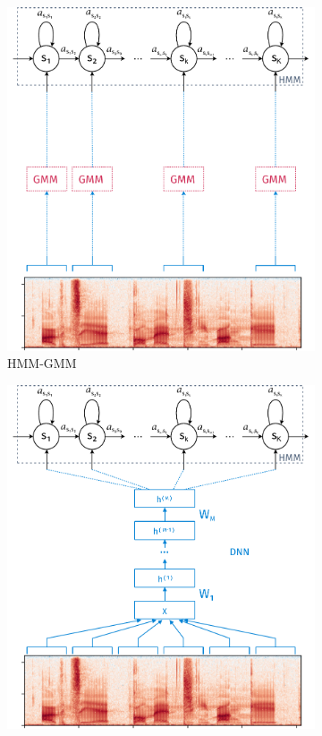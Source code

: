 \begin{figure}[htpb]
  \centering
  \begin{subfigure}[b]{0.4\textwidth}
    \includegraphics[width=\textwidth]{./ch4-experiments/img/HMM-GMM.pdf}
    \caption{HMM-GMM}
    \label{fig:experiments:normalization:hmm:gmm}
  \end{subfigure}
  \begin{subfigure}[b]{0.4\textwidth}
    \includegraphics[width=\textwidth]{./ch4-experiments/img/HMM-DNN.pdf}

\end{subfigure}
\end{figure}
